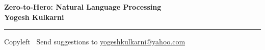 
\graphicspath{{images/}}

\footnotesize


\begin{center}
\Large{\textbf{Zero-to-Hero: Natural Language Processing\\ Yogesh Kulkarni}}  
\end{center}

\begin{multicols}{2}

\end{multicols}

\rule{\linewidth}{0.25pt}
\scriptsize
Copyleft \textcopyleft\  Send suggestions to 
\href{http://www.yogeshkulkarni.com}{yogeshkulkarni@yahoo.com}


